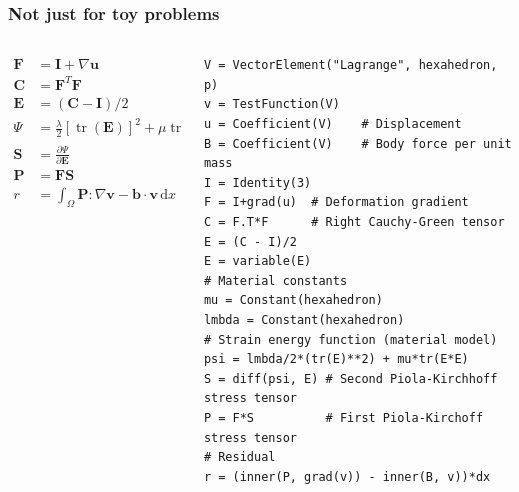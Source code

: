 \documentclass[presentation]{beamer}
\DeclareMathOperator{\tr}{tr}
\begin{document}
\begin{frame}[fragile]
  \frametitle{Not just for toy problems}
  \begin{columns}
    \begin{column}{0.4\textwidth}
      \begin{align*}
        \mathbf{F} &= \mathbf{I} + \nabla \mathbf{u}\\
        \mathbf{C} &= \mathbf{F}^T \mathbf{F}\\
        \mathbf{E} &= (\mathbf{C} - \mathbf{I}) / 2\\
        \Psi &= \frac{\lambda}{2}[\tr(\mathbf{E})]^2 + \mu \tr(\mathbf{E}^2)\\
        \mathbf{S} &= \frac{\partial \Psi}{\partial \mathbf{E}}\\
        \mathbf{P} &= \mathbf{F} \mathbf{S}\\
        r &= \int_\Omega \mathbf{P} : \nabla \mathbf{v} - \mathbf{b} \cdot \mathbf{v}\,\text{d}x\\
      \end{align*}
    \end{column}
    \begin{column}{0.6\textwidth}
\begin{verbatim}
V = VectorElement("Lagrange", hexahedron, p)
v = TestFunction(V)
u = Coefficient(V)    # Displacement
B = Coefficient(V)    # Body force per unit mass
I = Identity(3)
F = I+grad(u)  # Deformation gradient
C = F.T*F      # Right Cauchy-Green tensor
E = (C - I)/2
E = variable(E)
# Material constants
mu = Constant(hexahedron)
lmbda = Constant(hexahedron)
# Strain energy function (material model)
psi = lmbda/2*(tr(E)**2) + mu*tr(E*E)
S = diff(psi, E) # Second Piola-Kirchhoff stress tensor
P = F*S          # First Piola-Kirchoff stress tensor
# Residual
r = (inner(P, grad(v)) - inner(B, v))*dx
\end{verbatim}
    \end{column}
  \end{columns}
\end{frame}
\end{document}

